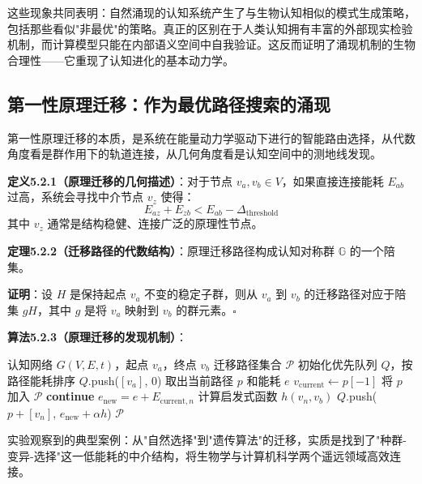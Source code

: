\documentclass[12pt,a4paper]{article}
\newcommand{\cognitivegroup}{\mathbb{G}}
\begin{document}
这些现象共同表明：自然涌现的认知系统产生了与生物认知相似的模式生成策略，包括那些看似"非最优"的策略。真正的区别在于人类认知拥有丰富的外部现实检验机制，而计算模型只能在内部语义空间中自我验证。这反而证明了涌现机制的生物合理性——它重现了认知进化的基本动力学。

\subsection{第一性原理迁移：作为最优路径搜索的涌现}

第一性原理迁移的本质，是系统在能量动力学驱动下进行的智能路由选择，从代数角度看是群作用下的轨道连接，从几何角度看是认知空间中的测地线发现。

\textbf{定义5.2.1（原理迁移的几何描述）}：对于节点 $v_a, v_b \in V$，如果直接连接能耗 $E_{ab}$ 过高，系统会寻找中介节点 $v_z$ 使得：
\begin{equation}
E_{az} + E_{zb} < E_{ab} - \Delta_{\text{threshold}}
\end{equation}
其中 $v_z$ 通常是结构稳健、连接广泛的原理性节点。

\textbf{定理5.2.2（迁移路径的代数结构）}：原理迁移路径构成认知对称群 $\cognitivegroup$ 的一个陪集。

\textbf{证明}：设 $H$ 是保持起点 $v_a$ 不变的稳定子群，则从 $v_a$ 到 $v_b$ 的迁移路径对应于陪集 $gH$，其中 $g$ 是将 $v_a$ 映射到 $v_b$ 的群元素。$\square$

\textbf{算法5.2.3（原理迁移的发现机制）}：
\begin{algorithm}
\caption{原理迁移的发现机制}
\begin{algorithmic}[1]
\Require 认知网络 $G(V,E,t)$，起点 $v_a$，终点 $v_b$
\Ensure 迁移路径集合 $\mathcal{P}$
\State 初始化优先队列 $Q$，按路径能耗排序
\State $Q$.push($[v_a]$, $0$) 
    \State 取出当前路径 $p$ 和能耗 $e$
    \State $v_{\text{current}} \gets p[-1]$ 
        \State 将 $p$ 加入 $\mathcal{P}$
        \State \textbf{continue}
    \EndIf
         
            \State $e_{\text{new}} = e + E_{\text{current},n}$
            \State 计算启发式函数 $h(v_n, v_b)$
            \State $Q$.push($p + [v_n]$, $e_{\text{new}} + \alpha h$)
        \EndIf
    \EndFor
\EndWhile
\State \Return $\mathcal{P}$
\end{algorithmic}
\end{algorithm}

实验观察到的典型案例：从"自然选择"到"遗传算法"的迁移，实质是找到了"种群-变异-选择"这一低能耗的中介结构，将生物学与计算机科学两个遥远领域高效连接。
\end{document}
